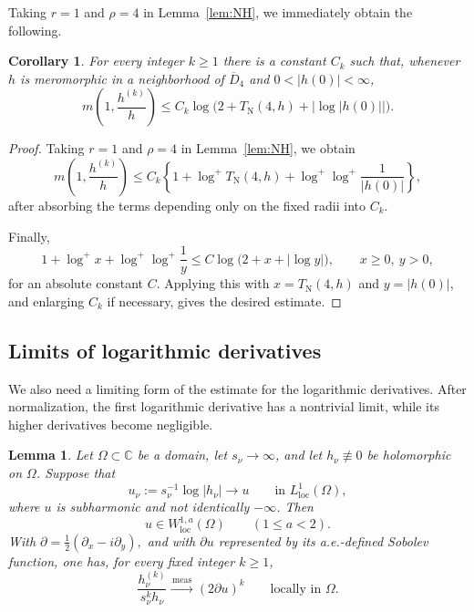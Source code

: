 \documentclass[12pt,letterpaper,reqno]{amsart}
\newtheorem{lem}[thm]{Lemma}
\newtheorem{cor}[thm]{Corollary}
\theoremstyle{definition}
\numberwithin{equation}{section}
\newcommand{\C}{\mathbb C}
\newcommand{\loc}{\mathrm{loc}}
\newcommand{\TN}{T_{\mathrm N}}
\newcommand{\convmeas}{\xrightarrow{\,\mathrm{meas}\,}}
\begin{document}
Taking \(r=1\) and \(\rho=4\) in Lemma~\ref{lem:NH}, we immediately obtain
the following.

\begin{cor}\label{lem:logderivbound}
For every integer \(k\ge1\) there is a constant \(C_k\) such that, whenever
\(h\) is meromorphic in a neighborhood of \(\overline D_4\) and
\(0<|h(0)|<\infty\),
\begin{equation}\label{eq:logderivbound}
 m\!\left(1,\frac{h^{(k)}}h\right)
 \leq C_k\log\bigl(2+\TN(4,h)+|\log|h(0)||\bigr).
\end{equation}
\end{cor}
\begin{proof}
 Taking \(r=1\) and \(\rho=4\)
in Lemma~\ref{lem:NH}, we obtain
\[
m\!\left(1,\frac{h^{(k)}}h\right)
\le C_k\left\{
1+\log^+\TN(4,h)
+\log^+\log^+\frac1{|h(0)|}
\right\},
\]
after absorbing the terms depending only on the fixed radii into \(C_k\).

Finally,
\[
1+\log^+x+\log^+\log^+\frac1y
\le C\log\bigl(2+x+|\log y|\bigr),
\qquad x\ge0,\ y>0,
\]
for an absolute constant \(C\).  Applying this with
\(x=\TN(4,h)\) and \(y=|h(0)|\), and enlarging \(C_k\) if necessary,
gives the desired estimate.
\end{proof}


\subsection{Limits of logarithmic derivatives}

We also need a limiting form of the estimate for the logarithmic derivatives.
After
normalization, the first logarithmic derivative has a nontrivial limit, while
its higher derivatives become negligible.

\begin{lem}\label{lem:logderivlimit}
Let \(\Omega\subset\C\) be a domain, let \(s_\nu\to\infty\), and let
\(h_\nu\not\equiv0\) be holomorphic on \(\Omega\). Suppose that
\begin{equation}\label{eq:log-limit-assumption}
 u_\nu:=s_\nu^{-1}\log|h_\nu|
 \longrightarrow u
 \qquad\text{in }L^1_{\loc}(\Omega),
\end{equation}
where \(u\) is subharmonic and not identically \(-\infty\). Then
\begin{equation}\label{eq:sobolev-limit}
 u\in W^{1,a}_{\loc}(\Omega)\qquad(1\leq a<2).
\end{equation}
With
$
 \partial=\tfrac12(\partial_x-i\partial_y),
$
and with \(\partial u\) represented by its a.e.-defined Sobolev function,
one has, for every fixed integer \(k\ge1\),
\begin{equation}\label{eq:logderivlimit}
 \frac{h_\nu^{(k)}}{s_\nu^kh_\nu}
 \convmeas (2\partial u)^k
 \qquad\text{locally in }\Omega.
\end{equation}
\end{lem}
\end{document}
